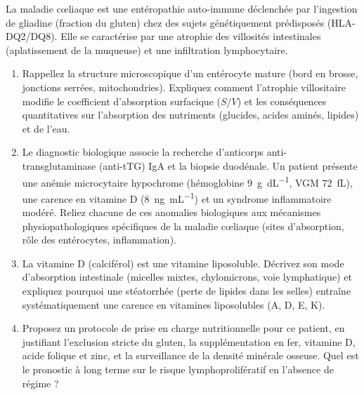 \documentclass[11pt]{article}
\begin{document}
\begin{exercice}
La maladie cœliaque est une entéropathie auto-immune déclenchée par l'ingestion de gliadine (fraction du gluten) chez des sujets génétiquement prédisposés (HLA-DQ2/DQ8). Elle se caractérise par une atrophie des villosités intestinales (aplatissement de la muqueuse) et une infiltration lymphocytaire.

\begin{enumerate}
    \item Rappellez la structure microscopique d'un entérocyte mature (bord en brosse, jonctions serrées, mitochondries). Expliquez comment l'atrophie villositaire modifie le coefficient d'absorption surfacique ($S/V$) et les conséquences quantitatives sur l'absorption des nutriments (glucides, acides aminés, lipides) et de l'eau.
    \item Le diagnostic biologique associe la recherche d'anticorps anti-transglutaminase (anti-tTG) IgA et la biopsie duodénale. Un patient présente une anémie microcytaire hypochrome (hémoglobine \SI{9}{g.dL^{-1}}, VGM \SI{72}{fL}), une carence en vitamine D (\SI{8}{ng.mL^{-1}}) et un syndrome inflammatoire modéré. Reliez chacune de ces anomalies biologiques aux mécanismes physiopathologiques spécifiques de la maladie cœliaque (sites d'absorption, rôle des entérocytes, inflammation).
    \item La vitamine D (calciférol) est une vitamine liposoluble. Décrivez son mode d'absorption intestinale (micelles mixtes, chylomicrons, voie lymphatique) et expliquez pourquoi une stéatorrhée (perte de lipides dans les selles) entraîne systématiquement une carence en vitamines liposolubles (A, D, E, K).
    \item Proposez un protocole de prise en charge nutritionnelle pour ce patient, en justifiant l'exclusion stricte du gluten, la supplémentation en fer, vitamine D, acide folique et zinc, et la surveillance de la densité minérale osseuse. Quel est le pronostic à long terme sur le risque lymphoprolifératif en l'absence de régime ?
\end{enumerate}
\end{exercice}
\end{document}

